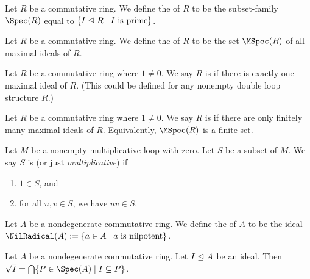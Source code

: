 \begin{definition}
Let $R$ be a commutative ring. We define the  of $R$
to be the subset-family $\Spec(R)$ equal to $\{I\ideal R\mid I\mbox{ is prime}\}$.
\end{definition}

\begin{definition}
Let $R$ be a commutative ring.
We define the  of $R$ to be the set $\MSpec(R)$ of all
maximal ideals of $R$.
\end{definition}

\begin{definition}
Let $R$ be a commutative ring where $1\neq0$.
We say $R$ is  if there is exactly one maximal ideal of $R$.
(This could be defined for any nonempty double loop structure $R$.)
\end{definition}

\begin{definition}
Let $R$ be a commutative ring where $1\neq0$.
We say $R$ is  if there are only finitely many
maximal ideals of $R$. Equivalently, $\MSpec(R)$ is a finite set.
\end{definition}

\begin{definition}
Let $M$ be a nonempty multiplicative loop with zero.
Let $S$ be a subset of $M$.
We say $S$ is  (or just \emph{multiplicative})
if
\begin{enumerate}
\item $1\in S$, and
\item for all $u,v\in S$, we have $uv\in S$.
\end{enumerate}
\end{definition}

\begin{definition}
Let $A$ be a nondegenerate commutative ring.
We define the  of $A$ to be the ideal
$\NilRadical(A):=\{a\in A\mid a\mbox{ is nilpotent}\}$. 
\end{definition}

\begin{theorem}
Let $A$ be a nondegenerate commutative ring.
Let $I\mathrel{\trianglelefteq} A$ be an ideal.
Then $\Radical{I}=\Intersects\{P\in\Spec(A)\mid I\subset P\}$.
\end{theorem}

